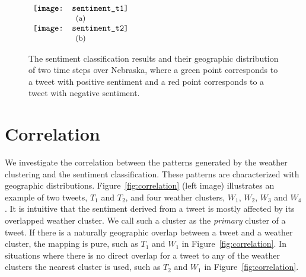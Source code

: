 \begin{figure}[t]
\begin{center}
$\begin{array}{c}
\texttt{[image: sentiment\_t1]} \\
\mbox{\small{(a)}} \\
\texttt{[image: sentiment\_t2]} \\
\mbox{\small{(b)}}
\end{array}$
\end{center}
\vspace{-.1in}
\caption{The sentiment classification results and their geographic distribution of two time steps over Nebraska, where a green point corresponds to a tweet with positive sentiment and a red point corresponds to a tweet with negative sentiment.}
\label{fig:sentiment}
\end{figure}


\section{Correlation}
\label{sec:corr}

We investigate the correlation between the patterns generated by the weather clustering and the sentiment classification. These patterns are characterized with geographic distributions. Figure~\ref{fig:correlation} (left image) illustrates an example of two tweets, $T_1$ and $T_2$, and four weather clusters, $W_1$, $W_2$, $W_3$ and $W_4$. It is intuitive that the sentiment derived from a tweet is mostly affected by its overlapped weather cluster. We call such a cluster as the \emph{primary} cluster of a tweet. If there is a naturally geographic overlap between a tweet and a weather cluster, the mapping is pure, such as $T_1$ and $W_1$ in Figure~\ref{fig:correlation}. In situations where there is no direct overlap for a tweet to any of the weather clusters the nearest cluster is used, such as $T_2$ and $W_1$ in Figure~\ref{fig:correlation}.


